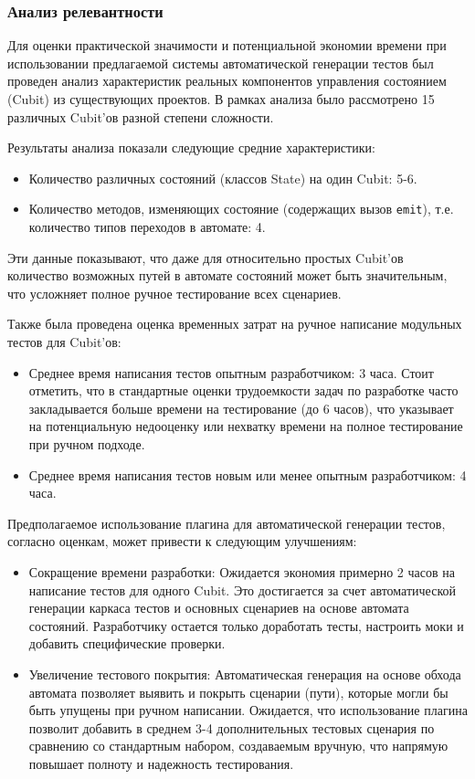 \documentclass[14pt, russian]{scrartcl}
\begin{document}
\subsubsection{Анализ релевантности}

Для оценки практической значимости и потенциальной экономии времени при использовании предлагаемой системы автоматической генерации тестов был проведен анализ характеристик реальных компонентов управления состоянием (Cubit) из существующих проектов. В рамках анализа было рассмотрено 15 различных Cubit'ов разной степени сложности.

Результаты анализа показали следующие средние характеристики:
\begin{itemize}
    \item Количество различных состояний (классов State) на один Cubit: 5-6.
    \item Количество методов, изменяющих состояние (содержащих вызов \texttt{emit}), т.е. количество типов переходов в автомате: 4.
\end{itemize}

Эти данные показывают, что даже для относительно простых Cubit'ов количество возможных путей в автомате состояний может быть значительным, что усложняет полное ручное тестирование всех сценариев.

Также была проведена оценка временных затрат на ручное написание модульных тестов для Cubit'ов:
\begin{itemize}
    \item Среднее время написания тестов опытным разработчиком: 3 часа. Стоит отметить, что в стандартные оценки трудоемкости задач по разработке часто закладывается больше времени на тестирование (до 6 часов), что указывает на потенциальную недооценку или нехватку времени на полное тестирование при ручном подходе.
    \item Среднее время написания тестов новым или менее опытным разработчиком: 4 часа.
\end{itemize}

Предполагаемое использование плагина для автоматической генерации тестов, согласно оценкам, может привести к следующим улучшениям:
\begin{itemize}
    \item {Сокращение времени разработки:} Ожидается экономия примерно 2 часов на написание тестов для одного Cubit. Это достигается за счет автоматической генерации каркаса тестов и основных сценариев на основе автомата состояний. Разработчику остается только доработать тесты, настроить моки и добавить специфические проверки.
    \item {Увеличение тестового покрытия:} Автоматическая генерация на основе обхода автомата позволяет выявить и покрыть сценарии (пути), которые могли бы быть упущены при ручном написании. Ожидается, что использование плагина позволит добавить в среднем 3-4 дополнительных тестовых сценария по сравнению со стандартным набором, создаваемым вручную, что напрямую повышает полноту и надежность тестирования.
\end{itemize}
\end{document}
